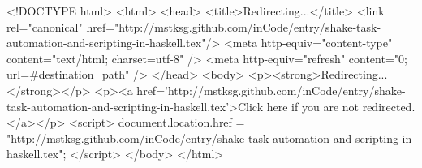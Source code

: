 <!DOCTYPE html>
<html>
<head>
<title>Redirecting...</title>
<link rel="canonical" href="http://mstksg.github.com/inCode/entry/shake-task-automation-and-scripting-in-haskell.tex"/>
<meta http-equiv="content-type" content="text/html; charset=utf-8" />
<meta http-equiv="refresh" content="0; url=#{destination_path}" />
</head>
<body>
  <p><strong>Redirecting...</strong></p>
  <p><a href='http://mstksg.github.com/inCode/entry/shake-task-automation-and-scripting-in-haskell.tex'>Click here if you are not redirected.</a></p>
  <script>
    document.location.href = "http://mstksg.github.com/inCode/entry/shake-task-automation-and-scripting-in-haskell.tex";
  </script>
</body>
</html>
